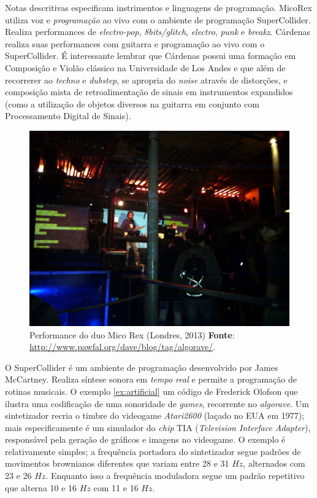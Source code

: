 Notas descritivas especificam instrimentos e linguagens de programação. MicoRex utiliza voz e \emph{programação} ao vivo com o ambiente de programação SuperCollider. Realiza performances de \emph{electro-pop}, \emph{8bits/glitch}, \emph{electro}, \emph{punk} e \emph{breakz}. Cárdenas realiza suas performances com guitarra e programação ao vivo com o SuperCollider. É interessante lembrar que Cárdenas possui uma formação em Composição e Violão clássico na Universidade de Los Andes e que além de recorrerer ao \emph{techno} e \emph{dubstep}, se apropria do \emph{noise} através de distorções, e composição mista de retroalimentação de sinais em instrumentos expandidos (como a utilização de objetos diversos na guitarra em conjunto com Processamento Digital de Sinais).

\begin{figure}[!h]
  \centering
  \includegraphics[scale=0.31]{imagens/algorave.jpg}
  \caption{Performance do duo Mico Rex (Londres, 2013) \textbf{Fonte}: \url{http://www.pawfal.org/dave/blog/tag/algorave/}.}
  \label{fig:micorex}
\end{figure}

O SuperCollider é um ambiente de programação desenvolvido por James McCartney. Realiza síntese sonora em \emph{tempo real} e permite a programação de rotinas musicais. O exemplo \autoref{ex:artificial} um código de Frederick Olofson que ilustra uma codificação de uma sonoridade de \emph{games}, recorrente no \emph{algorave}.  Um sintetizador recria o timbre do videogame \emph{Atari2600} (laçado no EUA em 1977); mais especificamente é um simulador do \emph{chip} TIA (\emph{Television Interface Adapter}), responsável pela geração de gráficos e imagens no videogame. O exemplo é relativamente simples; a frequência portadora do sintetizador segue padrões de movimentos brownianos diferentes que variam entre 28 e 31 $Hz$, alternados com 23 e 26 $Hz$. Enquanto isso a frequência moduladora segue um padrão repetitivo que alterna 10 e 16 $Hz$ com 11 e 16 $Hz$.

